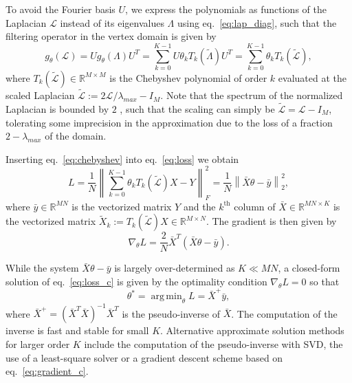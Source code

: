 \documentclass{article}
\DeclareMathOperator*{\argmin}{arg\,min}
\renewcommand{\L}{\mathcal{L}}
\newcommand{\R}{\mathbb{R}}
\newcommand{\norm}[1]{\left\| #1 \right\|}
\begin{document}
To avoid the Fourier basis \(U\), we express the polynomials as
functions of the Laplacian \(\L\) instead of its eigenvalues \(\Lambda\)
using eq.~\ref{eq:lap_diag}, such that the filtering operator in the
vertex domain is given by
\begin{equation} g_\theta(\L) = U g_\theta(\Lambda) U^T =
\sum_{k=0}^{K-1} U \theta_k T_k(\tilde{\Lambda}) U^T =
\sum_{k=0}^{K-1} \theta_k T_k(\tilde{\L}), \label{eq:chebyshev}\end{equation}
where \(T_k(\tilde{\L}) \in \R^{M \times M}\) is the Chebyshev
polynomial of order \(k\) evaluated at the scaled Laplacian
\(\tilde{\L} := 2 \L / \lambda_{max} - I_M\). Note that the spectrum of
the normalized Laplacian is bounded by \(2\)
\citep{chung_spectral_1997}, such that the scaling can simply be
\(\tilde{\L} = \L - I_M\), tolerating some imprecision in the
approximation due to the loss of a fraction \(2-\lambda_{max}\) of the
domain.

Inserting eq.~\ref{eq:chebyshev} into eq.~\ref{eq:loss} we obtain
\begin{equation} L =
\frac{1}{N} \norm{ \sum_{k=0}^{K-1} \theta_k T_k(\tilde{\L}) X - Y }_F^2 =
\frac{1}{N} \norm{ \bar{X} \theta - \bar{y} }_2^2, \label{eq:loss_c}\end{equation}
where \(\bar{y} \in \R^{MN}\) is the vectorized matrix \(Y\) and the
\(k^\text{th}\) column of \(\bar{X} \in \R^{MN \times K}\) is the
vectorized matrix
\(\tilde{X}_k := T_k(\tilde{\L}) X \in \R^{M \times N}\). The gradient
is then given by \begin{equation} \nabla_\theta L =
\frac{2}{N} \bar{X}^T (\bar{X} \theta - \bar{y}). \label{eq:gradient_c}\end{equation}

While the system \(\bar{X} \theta - \bar{y}\) is largely over-determined
as \(K \ll MN\), a closed-form solution of eq.~\ref{eq:loss_c} is given
by the optimality condition \(\nabla_\theta L = 0\) so that
\begin{equation} \theta^* = \argmin_\theta L = \bar{X}^+ \bar{y}, \label{eq:direct_c}\end{equation}
where \(\bar{X}^+ = (\bar{X}^T\bar{X})^{-1} \bar{X}^T\) is the
pseudo-inverse of \(\bar{X}\). The computation of the inverse is fast
and stable for small \(K\). Alternative approximate solution methods for
larger order \(K\) include the computation of the pseudo-inverse with
\gls{SVD}, the use of a least-square solver or a gradient descent scheme
based on eq.~\ref{eq:gradient_c}.
\end{document}
